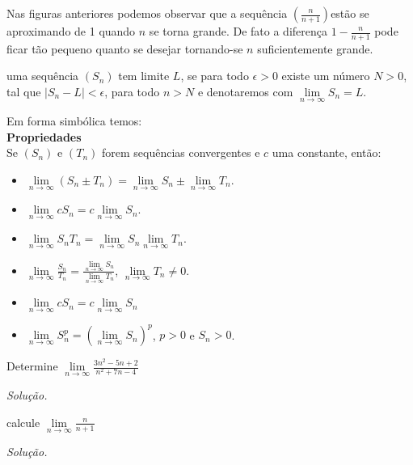 Nas figuras anteriores podemos observar que a sequência $\left( \frac{n}{n+1}\right)$estão se aproximando de 1 quando $n$ se torna grande. De fato a diferença $1-\frac{n}{n+1}$ pode ficar tão pequeno quanto se desejar tornando-se $n$ suficientemente grande. 
\begin{df}
	uma sequência $\left( S_{n}\right) $ tem limite $L$, se para todo $\epsilon >0$ existe um número $N>0$, tal que $\left| S_{n}-L\right| < \epsilon$, para todo $n>N$ e denotaremos com $\lim\limits_{n\longrightarrow \infty} S_{n}=L$.
\end{df}
Em forma simbólica temos:
\vspace*{5cm}
\\
\textbf{Propriedades}\\
Se $\left( S_{n}\right)$ e $\left( T_{n}\right)$ forem sequências convergentes e $c$ uma constante, então:
\begin{itemize} 
	\item $\lim\limits_{n\longrightarrow \infty} \left( S_{n}\pm T_{n}\right) =\lim\limits_{n\longrightarrow \infty}  S_{n}\pm\lim\limits_{n\longrightarrow \infty}  T_{n}$.
	\item $\lim\limits_{n\longrightarrow \infty} cS_{n} =c\lim\limits_{n\longrightarrow \infty}  S_{n}$.
	\item $\lim\limits_{n\longrightarrow \infty} S_{n} T_{n} =\lim\limits_{n\longrightarrow \infty}  S_{n}\lim\limits_{n\longrightarrow \infty}  T_{n}$.
	\item $\lim\limits_{n\longrightarrow \infty} \frac{S_{n} }{T_{n}} =\frac{\lim\limits_{n\longrightarrow \infty}  S_{n}}{\lim\limits_{n\longrightarrow \infty}  T_{n}}$, $\lim\limits_{n\longrightarrow \infty}  T_{n}\neq 0 $.
	\item $\lim\limits_{n\longrightarrow \infty} cS_{n} =c\lim\limits_{n\longrightarrow \infty}  S_{n}$
	\item $\lim\limits_{n\longrightarrow \infty} S_{n}^{p}=\left(\lim\limits_{n\longrightarrow \infty}S_{n} \right)^{p} $, $p>0$ e $S_{n}>0$.
\end{itemize}
\begin{ex} 
Determine $\lim\limits_{n\longrightarrow \infty} \frac{3n^{2}-5n+2}{n^{2}+7n-4}$
\end{ex}
\textit{Solução.}
\vspace*{5cm}
\begin{ex} 
	calcule $\lim\limits_{n\longrightarrow \infty} \frac{n}{n+1}$
\end{ex}
\textit{Solução.}
\vspace*{5cm}
